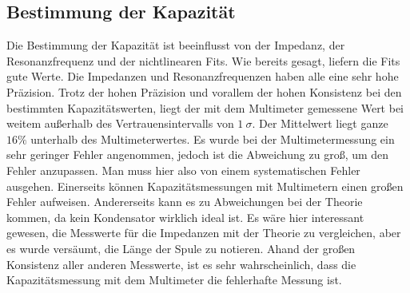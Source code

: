 \documentclass[12pt,a4paper,titlepage,headinclude]{scrartcl}
\numberwithin{equation}{subsection}
\begin{document}
\subsection{Bestimmung der Kapazität}
Die Bestimmung der Kapazität ist beeinflusst von der Impedanz, der Resonanzfrequenz und der nichtlinearen Fits. Wie bereits gesagt, liefern die Fits gute Werte. Die Impedanzen und Resonanzfrequenzen haben alle eine sehr hohe Präzision. Trotz der hohen Präzision und vorallem der hohen Konsistenz bei den bestimmten Kapazitätswerten, liegt der mit dem Multimeter gemessene Wert bei weitem außerhalb des Vertrauensintervalls von  $1~\sigma$. Der Mittelwert liegt ganze $16\%$ unterhalb des Multimeterwertes. Es wurde bei der Multimetermessung ein sehr geringer Fehler angenommen, jedoch ist die Abweichung zu groß, um den Fehler anzupassen. Man muss hier also von einem systematischen Fehler ausgehen. Einerseits können Kapazitätsmessungen mit Multimetern einen großen Fehler aufweisen. Andererseits kann es zu Abweichungen bei der Theorie kommen, da kein Kondensator wirklich ideal ist. Es wäre hier interessant gewesen, die Messwerte für die Impedanzen mit der Theorie zu vergleichen, aber es wurde versäumt, die Länge der Spule zu notieren. Ahand der großen Konsistenz aller anderen Messwerte, ist es sehr wahrscheinlich, dass die Kapazitätsmessung mit dem Multimeter die fehlerhafte Messung ist.
\newpage
\printbibliography[heading=bibintoc]
\end{document}
